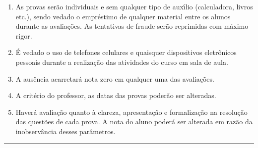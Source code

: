 \documentclass[12pt]{article}
\begin{document}



\begin{enumerate}[label=({\arabic*})]
\item As provas ser\~{a}o individuais e sem qualquer tipo de
aux\'{\i}lio (calculadora, livros etc.), sendo vedado o empr\'{e}stimo de
qualquer material entre os alunos durante as avalia\c{c}\~{o}es. As
tentativas de fraude ser\~{a}o reprimidas com m\'{a}ximo rigor.
\vspace{-0.25cm}

\item \'{E} vedado o uso de telefones celulares e quaisquer dispositivos eletr\^{o}nicos pessoais durante a realiza\c{c}\~{a}o das atividades do curso em sala de aula. \vspace{-0.25cm}


\item A aus\^{e}ncia acarretar\'{a} nota zero em qualquer uma das
avalia\c{c}\~{o}es. \vspace{-0.25cm}

\item A crit\'{e}rio do professor, as datas das provas poder\~{a}o
ser alteradas. \vspace{-0.25cm}

\item Haver{\'a} avalia{\c c}{\~a}o quanto {\`a} clareza, apresenta{\c
c}{\~a}o e formaliza{\c c}{\~a}o na  resolu{\c c}{\~a}o das quest{\~o}es de
cada prova. A nota do aluno poder{\'a} ser alterada em raz{\~a}o da
inobserv{\^a}ncia desses par{\^a}metros.
\end{enumerate}


\vfill
\hrule
\end{document}
